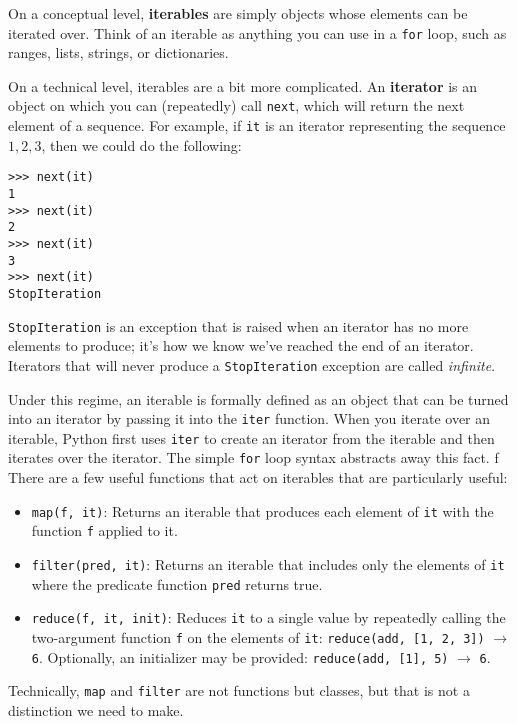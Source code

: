 On a conceptual level, \textbf{iterables} are simply objects whose elements can be iterated over. Think of an iterable as anything you can use in a \lstinline{for} loop, such as ranges, lists, strings, or dictionaries.

On a technical level, iterables are a bit more complicated. An \textbf{iterator} is an object on which you can (repeatedly) call \lstinline{next}, which will return the next element of a sequence. For example, if \lstinline{it} is an iterator representing the sequence $1, 2, 3$, then we could do the following: 
\begin{lstlisting}
>>> next(it)
1
>>> next(it)
2
>>> next(it)
3
>>> next(it)
StopIteration
\end{lstlisting}

\lstinline{StopIteration} is an exception that is raised when an iterator has no more elements to produce; it's how we know we've reached the end of an iterator. Iterators that will never produce a \lstinline{StopIteration} exception are called \textit{infinite}. 

Under this regime, an iterable is formally defined as an object that can be turned into an iterator by passing it into the \lstinline{iter} function. When you iterate over an iterable, Python first uses \lstinline{iter} to create an iterator from the iterable and then iterates over the iterator. The simple \lstinline{for} loop syntax abstracts away this fact. 
f
There are a few useful functions that act on iterables that are particularly useful: 
\begin{itemize}
    \item \lstinline{map(f, it)}: Returns an iterable that produces each element of \lstinline{it} with the function \lstinline{f} applied to it.
    \item \lstinline{filter(pred, it)}: Returns an iterable that includes only the elements of \lstinline{it} where the predicate function \lstinline{pred} returns true. 
    \item \lstinline{reduce(f, it, init)}: Reduces \lstinline{it} to a single value by repeatedly calling the two-argument function \lstinline{f} on the elements of \lstinline{it}: \lstinline{reduce(add, [1, 2, 3])} $\rightarrow$ \lstinline{6}. Optionally, an initializer may be provided: \lstinline{reduce(add, [1], 5)} $\rightarrow$ \lstinline{6}. 
\end{itemize}

\begin{meta}
Technically, \lstinline{map} and \lstinline{filter} are not functions but classes, but that is not a distinction we need to make. 
\end{meta}

